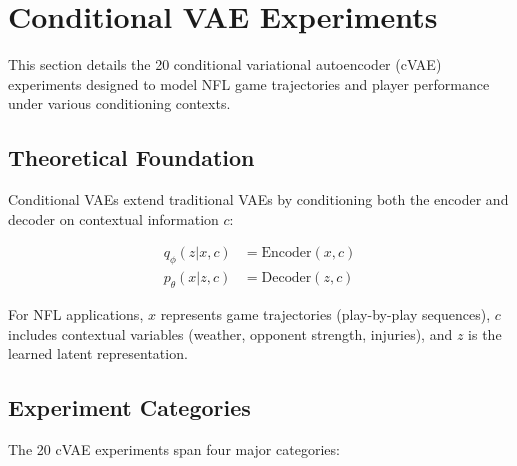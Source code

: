 \section{Conditional VAE Experiments}
\label{sec:cvae_experiments}

This section details the 20 conditional variational autoencoder (cVAE) experiments designed to model NFL game trajectories and player performance under various conditioning contexts.

\subsection{Theoretical Foundation}

Conditional VAEs extend traditional VAEs by conditioning both the encoder and decoder on contextual information $c$:

\begin{align}
q_\phi(z|x,c) &= \text{Encoder}(x, c) \\
p_\theta(x|z,c) &= \text{Decoder}(z, c)
\end{align}

For NFL applications, $x$ represents game trajectories (play-by-play sequences), $c$ includes contextual variables (weather, opponent strength, injuries), and $z$ is the learned latent representation.

\subsection{Experiment Categories}

The 20 cVAE experiments span four major categories:

